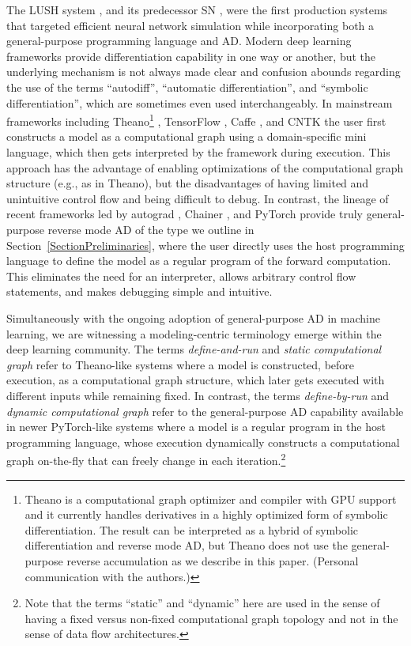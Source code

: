 \documentclass[twoside,11pt]{article}
\begin{document}
The LUSH system \citep{LUSH2002}, and its predecessor SN \citep{bottou-lecun-88}, were the first production systems that targeted efficient neural network simulation while incorporating both a general-purpose programming language and AD. Modern deep learning frameworks provide differentiation capability in one way or another, but the underlying mechanism is not always made clear and confusion abounds regarding the use of the terms ``autodiff'', ``automatic differentiation'', and ``symbolic differentiation'', which are sometimes even used interchangeably. In mainstream frameworks including Theano\footnote{Theano is a computational graph optimizer and compiler with GPU support and it currently handles derivatives in a highly optimized form of symbolic differentiation. The result can be interpreted as a hybrid of symbolic differentiation and reverse mode AD, but Theano does not use the general-purpose reverse accumulation as we describe in this paper. (Personal communication with the authors.)} \citep{Bastien2012}, TensorFlow \citep{abadi2016tensorflow}, Caffe \citep{jia2014caffe}, and CNTK \citep{seide2016cntk} the user first constructs a model as a computational graph using a domain-specific mini language, which then gets interpreted by the framework during execution. This approach has the advantage of enabling optimizations of the computational graph structure (e.g., as in Theano), but the disadvantages of having limited and unintuitive control flow and being difficult to debug. In contrast, the lineage of recent frameworks led by autograd \citep{maclaurin2016modeling}, Chainer \citep{tokui2015chainer}, and PyTorch \citep{paszke2017automatic} provide truly general-purpose reverse mode AD of the type we outline in Section~\ref{SectionPreliminaries}, where the user directly uses the host programming language to define the model as a regular program of the forward computation. This eliminates the need for an interpreter, allows arbitrary control flow statements, and makes debugging simple and intuitive.

Simultaneously with the ongoing adoption of general-purpose AD in machine learning, we are witnessing a modeling-centric terminology emerge within the deep learning community. The terms \emph{define-and-run} and \emph{static computational graph} refer to Theano-like systems where a model is constructed, before execution, as a computational graph structure, which later gets executed with different inputs while remaining fixed. In contrast, the terms \emph{define-by-run} and \emph{dynamic computational graph} refer to the general-purpose AD capability available in newer PyTorch-like systems where a model is a regular program in the host programming language, whose execution dynamically constructs a computational graph on-the-fly that can freely change in each iteration.\footnote{Note that the terms ``static'' and ``dynamic'' here are used in the sense of having a fixed versus non-fixed computational graph topology and not in the sense of data flow architectures.}
\end{document}

